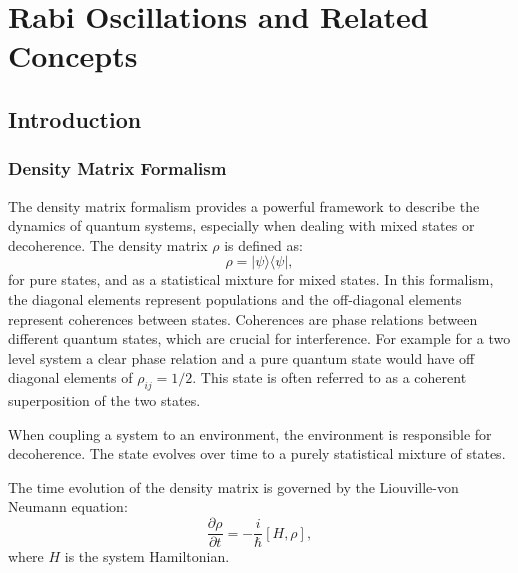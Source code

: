 
\chapter{Rabi Oscillations and Related Concepts} %

\label{chapter_rabi_oscillations} %

\section{Introduction}
\subsection{Density Matrix Formalism}

The density matrix formalism provides a powerful framework to describe the dynamics of quantum systems, especially when dealing with mixed states or decoherence.
The density matrix \(\rho\) is defined as:
\begin{equation}
	\rho = |\psi\rangle \langle \psi|,
	\label{eq:DensityMatrix}
\end{equation}
for pure states, and as a statistical mixture for mixed states. 
In this formalism, the diagonal elements represent populations and the off-diagonal elements represent coherences between states.
Coherences are phase relations between different quantum states, which are crucial for interference.
For example for a two level system a clear phase relation and a pure quantum state would have off diagonal elements of $ \rho_{ij} = 1/2$.
This state is often referred to as a coherent superposition of the two states.

When coupling a system to an environment, the environment is responsible for decoherence.
The state evolves over time to a purely statistical mixture of states.

The time evolution of the density matrix is governed by the Liouville-von Neumann equation:
\begin{equation}
	\frac{\partial \rho}{\partial t} = -\frac{i}{\hbar} [H, \rho],
	\label{eq:Liouville}
\end{equation}
where \(H\) is the system Hamiltonian.

